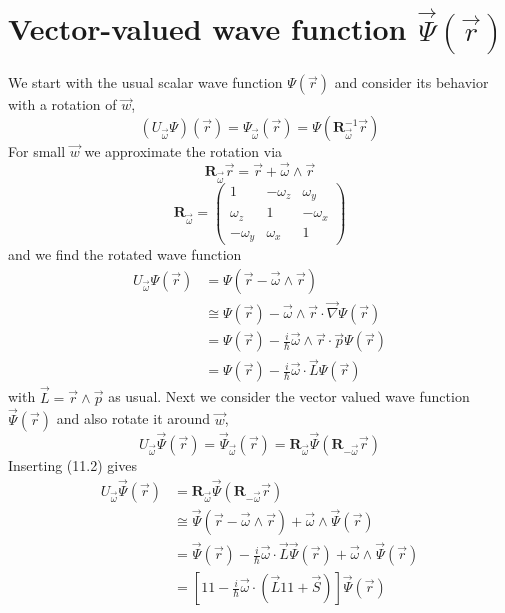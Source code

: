 \section{Vector-valued wave function $\vec{\Psi}(\vec{r})$}
We start with the usual scalar wave function $\Psi(\vec{r})$ and consider its behavior with a rotation of $\vec{w}$,
\begin{equation}
    \left(U_{\vec{\omega}} \Psi\right)(\vec{r})=\Psi_{\vec{\omega}}(\vec{r})=\Psi\left(\mathbf{R}_{\vec{\omega}}^{-1} \vec{r}\right)
    \end{equation}
For small $\vec{w}$ we approximate the rotation via
$$\mathbf{R}_{\vec{\omega}} \vec{r}=\vec{r}+\vec{\omega} \wedge \vec{r}$$
\begin{equation}
\mathbf{R}_{\vec{\omega}}=\left(\begin{array}{ccc}{1} & {-\omega_{z}} & {\omega_{y}} \\ {\omega_{z}} & {1} & {-\omega_{x}} \\ {-\omega_{y}} & {\omega_{x}} & {1}\end{array}\right)
\end{equation}
and we find the rotated wave function
\begin{equation}
\begin{aligned} U_{\vec{\omega}} \Psi(\vec{r}) &=\Psi(\vec{r}-\vec{\omega} \wedge \vec{r}) \\ & \cong \Psi(\vec{r})-\vec{\omega} \wedge \vec{r} \cdot \vec{\nabla} \Psi(\vec{r}) \\ &=\Psi(\vec{r})-\frac{i}{\hbar} \vec{\omega} \wedge \vec{r} \cdot \vec{p} \Psi(\vec{r}) \\ &=\Psi(\vec{r})-\frac{i}{\hbar} \vec{\omega} \cdot \vec{L} \Psi(\vec{r}) \end{aligned}
\end{equation}
with $\vec{L}=\vec{r}\wedge\vec{p}$ as usual. Next we consider the vector valued wave function $\vec{\Psi}(\vec{r})$ and also rotate it around $\vec{w}$,
\begin{equation}
    U_{\vec{\omega}} \vec{\Psi}(\vec{r})=\vec{\Psi}_{\vec{\omega}}(\vec{r})=\mathbf{R}_{\vec{\omega}} \vec{\Psi}\left(\mathbf{R}_{-\vec{\omega}} \vec{r}\right)
    \end{equation}
Inserting (11.2) gives
\begin{equation}
\begin{aligned} U_{\vec{\omega}} \vec{\Psi}(\vec{r}) &=\mathbf{R}_{\vec{\omega}} \vec{\Psi}\left(\mathbf{R}_{-\vec{\omega}} \vec{r}\right) \\ & \cong \vec{\Psi}(\vec{r}-\vec{\omega} \wedge \vec{r})+\vec{\omega} \wedge \vec{\Psi}(\vec{r}) \\ &=\vec{\Psi}(\vec{r})-\frac{i}{\hbar} \vec{\omega} \cdot \vec{L} \vec{\Psi}(\vec{r})+\vec{\omega} \wedge \vec{\Psi}(\vec{r}) \\ &=\left[11-\frac{i}{\hbar} \vec{\omega} \cdot(\vec{L} 11+\vec{S})\right] \vec{\Psi}(\vec{r}) \end{aligned}
\end{equation}
